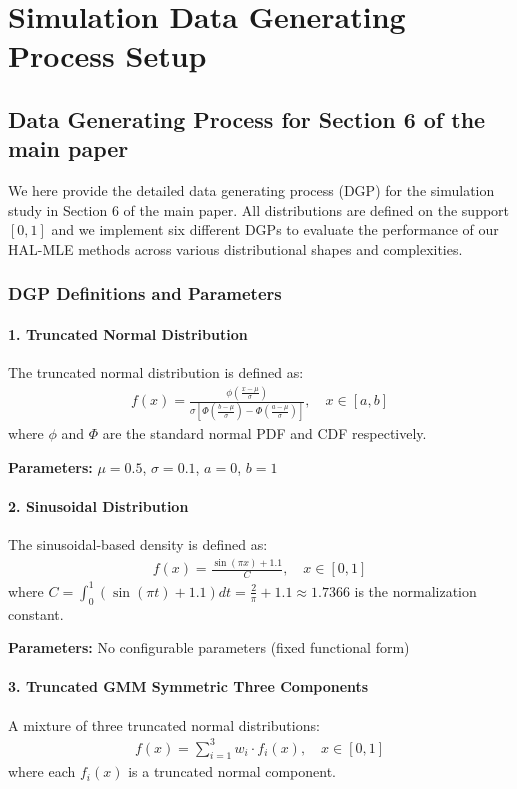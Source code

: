 \section{Simulation Data Generating Process Setup}
\label{app:dgp_setup}
\subsection{Data Generating Process for Section 6 of the main paper}

We here provide the detailed data generating process (DGP) for the simulation study in Section 6 of the main paper. All distributions are defined on the support $[0,1]$ and we implement six different DGPs to evaluate the performance of our HAL-MLE methods across various distributional shapes and complexities.

\subsubsection{DGP Definitions and Parameters} \label{app_g_1:dgp_definitions}

\paragraph{1. Truncated Normal Distribution}
The truncated normal distribution is defined as:
\begin{align}
f(x) = \frac{\phi\left(\frac{x-\mu}{\sigma}\right)}{\sigma \left[\Phi\left(\frac{b-\mu}{\sigma}\right) - \Phi\left(\frac{a-\mu}{\sigma}\right)\right]}, \quad x \in [a,b]
\end{align}
where $\phi$ and $\Phi$ are the standard normal PDF and CDF respectively.

\textbf{Parameters:} $\mu = 0.5$, $\sigma = 0.1$, $a = 0$, $b = 1$

\paragraph{2. Sinusoidal Distribution}
The sinusoidal-based density is defined as:
\begin{align}
f(x) = \frac{\sin(\pi x) + 1.1}{C}, \quad x \in [0,1]
\end{align}
where $C = \int_0^1 (\sin(\pi t) + 1.1) dt = \frac{2}{\pi} + 1.1 \approx 1.7366$ is the normalization constant.

\textbf{Parameters:} No configurable parameters (fixed functional form)

\paragraph{3. Truncated GMM Symmetric Three Components}
A mixture of three truncated normal distributions:
\begin{align}
f(x) = \sum_{i=1}^3 w_i \cdot f_i(x), \quad x \in [0,1]
\end{align}
where each $f_i(x)$ is a truncated normal component.


